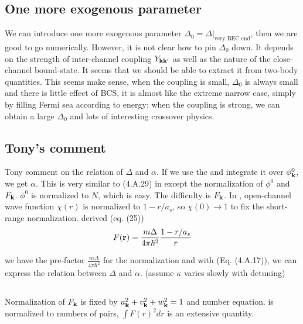 \subsection{One more exogenous parameter}
We can introduce one more exogenous parameter $\Delta_{0}=\Delta|_\text{very BEC end}$, then we are good to go numerically.  However, it is not clear how to pin $\Delta_{0}$ down.  It depends on the strength of inter-channel coupling $Y_{\mathbf{k}\mathbf{k}'}$ as well as the nature of the close-channel bound-state.  It seems that we should be able to extract it from two-body quantities.  This seems make sense, when the coupling is small, $\Delta_{0}$ is always small and there is little effect of BCS, it is almost like the extreme narrow case, simply by filling Fermi sea according to energy; when the coupling is strong, we can obtain a large $\Delta_{0}$ and lots of interesting crossover physics.  

\subsection{Tony's comment}
Tony comment on the relation of $\Delta$ and $\alpha$.  If we use the  and integrate it over $\phi^{0}_{\mathbf{k}}$, we get $\alpha$.  This is very similar to (4.A.29) in \cite{Leggett} except the normalization of $\phi^{0}$ and $F_{\mathbf{k}}$.  $\phi^{0}$ is normalized to $N$, which is easy.  The difficulty is $F_{\mathbf{k}}$.  In \cite{Leggett}, open-channel wave function $\chi(r)$ is normalized to $1-r/a_{s}$, so $\chi(0)\rightarrow1$ to fix the short-range normalization.  \cite{shizhongSumRule} derived  (eq. (25))
\begin{equation}\label{eq:20101025:fr}
F(\mathbf{r})=\frac{m\Delta}{4\pi\hbar^{2}}\frac{1-r/a_{s}}{r}
\end{equation}

we have the pre-factor $\frac{m\Delta}{4\pi\hbar^{2}}$ for the normalization and with \cite{Leggett} (Eq. (4.A.17)), we can express the relation between $\Delta$ and $\alpha$.  (assume $\kappa$ varies slowly with detuning)

\subsection{}
Normalization of $F_{\mathbf{k}}$ is fixed by $u_{\mathbf{k}}^2+v_{\mathbf{k}}^2+w_{\mathbf{k}}^2=1$ and number equation.   is normalized to numbers of pairs, $\int{F(r)^2dr}$ is an extensive quantity.  

